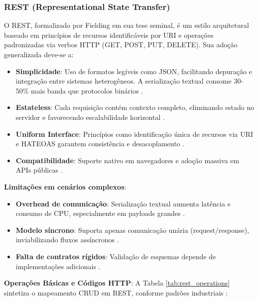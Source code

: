 \subsubsection{\gls{REST} (Representational State Transfer)}
O \gls{REST}, formalizado por Fielding \cite{fielding2000rest} em sua tese seminal, é um estilo arquitetural baseado em princípios de recursos identificáveis por \gls{URI} e operações padronizadas via verbos \gls{HTTP} (GET, POST, PUT, DELETE). Sua adoção generalizada deve-se a:

\begin{itemize}
\item \textbf{Simplicidade}: Uso de formatos legíveis como \gls{JSON}, facilitando depuração e integração entre sistemas heterogêneos. A serialização textual consome 30-50\% mais banda que protocolos binários \cite{niswar2023performance}.
\item \textbf{Estateless}: Cada requisição contém contexto completo, eliminando estado no servidor e favorecendo escalabilidade horizontal \cite{fielding2000rest}.
\item \textbf{Uniform Interface}: Princípios como identificação única de recursos via URI e \gls{HATEOAS} garantem consistência e desacoplamento \cite{maso2024comparativo}.
\item \textbf{Compatibilidade}: Suporte nativo em navegadores e adoção massiva em APIs públicas \cite{maso2024comparativo}.
\end{itemize}

\textbf{Limitações em cenários complexos}:
\begin{itemize}
\item \textbf{Overhead de comunicação}: Serialização textual aumenta latência e consumo de \gls{CPU}, especialmente em payloads grandes \cite{niswar2023performance}.
\item \textbf{Modelo síncrono}: Suporta apenas comunicação unária (request/response), inviabilizando fluxos assíncronos \cite{niswar2023performance}.
\item \textbf{Falta de contratos rígidos}: Validação de esquemas depende de implementações adicionais \cite{maso2024comparativo}.
\end{itemize}

\textbf{Operações Básicas e Códigos HTTP}:
A Tabela \ref{tab:rest_operations} sintetiza o mapeamento CRUD em REST, conforme padrões industriais \cite{fielding2000rest}:

